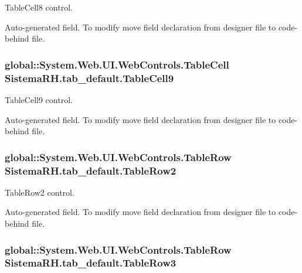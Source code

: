 TableCell8 control. 

Auto-\/generated field. To modify move field declaration from designer file to code-\/behind file. \hypertarget{class_sistema_r_h_1_1tab__default_a71bd839cd0b72c6908b79ef17d3ab10b}{
\subsubsection[{TableCell9}]{\setlength{\rightskip}{0pt plus 5cm}global::System.Web.UI.WebControls.TableCell {\bf SistemaRH.tab\_\-default.TableCell9}}}
\label{class_sistema_r_h_1_1tab__default_a71bd839cd0b72c6908b79ef17d3ab10b}


TableCell9 control. 

Auto-\/generated field. To modify move field declaration from designer file to code-\/behind file. \hypertarget{class_sistema_r_h_1_1tab__default_a0817cbd25c8af6f28f40a2bf0d430c54}{
\subsubsection[{TableRow2}]{\setlength{\rightskip}{0pt plus 5cm}global::System.Web.UI.WebControls.TableRow {\bf SistemaRH.tab\_\-default.TableRow2}}}
\label{class_sistema_r_h_1_1tab__default_a0817cbd25c8af6f28f40a2bf0d430c54}


TableRow2 control. 

Auto-\/generated field. To modify move field declaration from designer file to code-\/behind file. \hypertarget{class_sistema_r_h_1_1tab__default_aa06e2671b7d9e402a13308f8b34dece2}{
\subsubsection[{TableRow3}]{\setlength{\rightskip}{0pt plus 5cm}global::System.Web.UI.WebControls.TableRow {\bf SistemaRH.tab\_\-default.TableRow3}}}
\label{class_sistema_r_h_1_1tab__default_aa06e2671b7d9e402a13308f8b34dece2}


